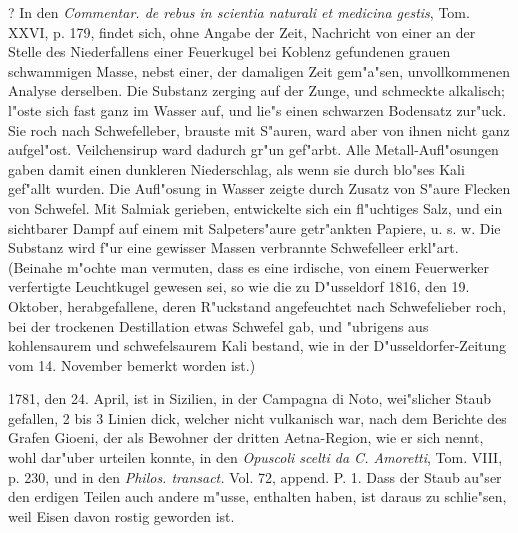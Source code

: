 \documentclass[a4paper, 11pt, oneside, polutonikogreek, german]{article}
\begin{document}
? In den \emph{Commentar. de rebus in scientia naturali et medicina gestis}, Tom. XXVI, p. 179, findet sich, ohne Angabe der Zeit, Nachricht von einer an der Stelle des Niederfallens einer Feuerkugel bei Koblenz gefundenen grauen schwammigen Masse, nebst einer, der damaligen Zeit gem"a"sen, unvollkommenen Analyse derselben. Die Substanz zerging auf der Zunge, und schmeckte alkalisch; l"oste sich fast ganz im Wasser auf, und lie"s einen schwarzen Bodensatz zur"uck. Sie roch nach Schwefelleber, brauste mit S"auren, ward aber von ihnen nicht ganz aufgel"ost. Veilchensirup ward dadurch gr"un gef"arbt. Alle Metall-Aufl"osungen gaben damit einen dunkleren Niederschlag, als wenn sie durch blo"ses Kali gef"allt wurden. Die Aufl"osung in Wasser zeigte durch Zusatz von S"aure Flecken von Schwefel. Mit Salmiak gerieben, entwickelte sich ein fl"uchtiges Salz, und ein sichtbarer Dampf auf einem mit Salpeters"aure getr"ankten Papiere, u. s. w. Die Substanz wird f"ur eine gewisser Massen verbrannte Schwefelleer erkl"art. (Beinahe m"ochte man vermuten, dass es eine irdische, von einem Feuerwerker verfertigte Leuchtkugel gewesen sei, so wie die zu D"usseldorf 1816, den 19. Oktober, herabgefallene, deren R"uckstand angefeuchtet nach Schwefelieber roch, bei der trockenen Destillation etwas Schwefel gab, und "ubrigens aus kohlensaurem und schwefelsaurem Kali bestand, wie in der D"usseldorfer-Zeitung vom 14. November bemerkt worden ist.)

1781, den 24. April, ist in Sizilien, in der Campagna di Noto, wei"slicher Staub gefallen, 2 bis 3 Linien dick, welcher nicht vulkanisch war, nach dem Berichte des Grafen Gioeni, der als Bewohner der dritten Aetna-Region, wie er sich nennt, wohl dar"uber urteilen konnte, in den \emph{Opuscoli scelti da C. Amoretti}, Tom. VIII, p. 230, und in den \emph{Philos. transact.} Vol. 72, append. P. 1. Dass der Staub au"ser den erdigen Teilen auch andere m"usse, enthalten haben, ist daraus zu schlie"sen, weil Eisen davon rostig geworden ist.
\end{document}
